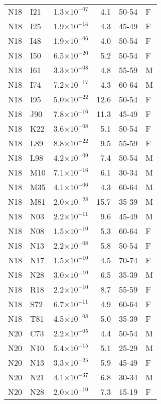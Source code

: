 \begin{longtable}{lllrll}
   N18 & I21 & 1.3$\times10^{-07}$ & 4.1 & 50-54 & F \\ 
   N18 & I25 & 1.9$\times10^{-14}$ & 4.3 & 45-49 & F \\ 
   N18 & I48 & 1.9$\times10^{-06}$ & 4.0 & 50-54 & F \\ 
   N18 & I50 & 6.5$\times10^{-20}$ & 5.2 & 50-54 & F \\ 
   N18 & I61 & 3.3$\times10^{-08}$ & 4.8 & 55-59 & M \\ 
   N18 & I74 & 7.2$\times10^{-17}$ & 4.3 & 60-64 & M \\ 
   N18 & I95 & 5.0$\times10^{-22}$ & 12.6 & 50-54 & F \\ 
   N18 & J90 & 7.8$\times10^{-16}$ & 11.3 & 45-49 & F \\ 
   N18 & K22 & 3.6$\times10^{-08}$ & 5.1 & 50-54 & F \\ 
   N18 & L89 & 8.8$\times10^{-22}$ & 9.5 & 55-59 & F \\ 
   N18 & L98 & 4.2$\times10^{-09}$ & 7.4 & 50-54 & M \\ 
   N18 & M10 & 7.1$\times10^{-16}$ & 6.1 & 30-34 & M \\ 
   N18 & M35 & 4.1$\times10^{-06}$ & 4.3 & 60-64 & M \\ 
   N18 & M81 & 2.0$\times10^{-28}$ & 15.7 & 35-39 & M \\ 
   N18 & N03 & 2.2$\times10^{-11}$ & 9.6 & 45-49 & M \\ 
   N18 & N08 & 1.5$\times10^{-10}$ & 5.3 & 60-64 & F \\ 
   N18 & N13 & 2.2$\times10^{-08}$ & 5.8 & 50-54 & F \\ 
   N18 & N17 & 1.5$\times10^{-10}$ & 4.5 & 70-74 & F \\ 
   N18 & N28 & 3.0$\times10^{-10}$ & 6.5 & 35-39 & M \\ 
   N18 & R18 & 2.2$\times10^{-10}$ & 8.7 & 55-59 & F \\ 
   N18 & S72 & 6.7$\times10^{-11}$ & 4.9 & 60-64 & F \\ 
   N18 & T81 & 4.5$\times10^{-08}$ & 5.0 & 35-39 & F \\ 
   N20 & C73 & 2.2$\times10^{-05}$ & 4.4 & 50-54 & M \\ 
   N20 & N10 & 5.4$\times10^{-15}$ & 5.1 & 25-29 & M \\ 
   N20 & N13 & 3.3$\times10^{-25}$ & 5.9 & 45-49 & F \\ 
   N20 & N21 & 4.1$\times10^{-37}$ & 6.8 & 30-34 & M \\ 
   N20 & N28 & 2.0$\times10^{-10}$ & 7.3 & 15-19 & F \\ 

\end{longtable}
